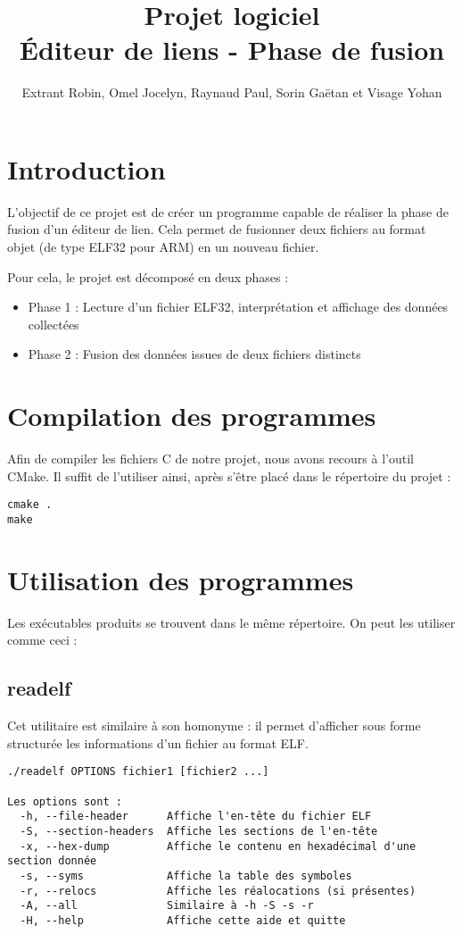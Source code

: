 \documentclass[a4paper,11pt]{article}
\title{Projet logiciel \\ Éditeur de liens - Phase de fusion}
\author{Extrant Robin, Omel Jocelyn, Raynaud Paul, Sorin Gaëtan et Visage Yohan}
\begin{document}
\maketitle
\tableofcontents

\section{Introduction}
L'objectif de ce projet est de créer un programme capable de réaliser la phase de fusion d'un éditeur de lien. Cela permet de fusionner deux fichiers au format objet (de type ELF32 pour ARM) en un nouveau fichier.

Pour cela, le projet est décomposé en deux phases :
\begin{itemize}
\item Phase 1 : Lecture d'un fichier ELF32, interprétation et affichage des données collectées
\item Phase 2 : Fusion des données issues de deux fichiers distincts
\end{itemize}

\section{Compilation des programmes}
Afin de compiler les fichiers C de notre projet, nous avons recours à l'outil CMake. Il suffit de l'utiliser ainsi, après s'être placé dans le répertoire du projet :
\begin{verbatim}
cmake .
make
\end{verbatim}

\section{Utilisation des programmes}
Les exécutables produits se trouvent dans le même répertoire. On peut les utiliser comme ceci :
\subsection{readelf}
Cet utilitaire est similaire à son homonyme : il permet d'afficher sous forme structurée les informations d'un fichier au format ELF.
\begin{verbatim}
./readelf OPTIONS fichier1 [fichier2 ...]

Les options sont :
  -h, --file-header      Affiche l'en-tête du fichier ELF
  -S, --section-headers  Affiche les sections de l'en-tête
  -x, --hex-dump         Affiche le contenu en hexadécimal d'une section donnée
  -s, --syms             Affiche la table des symboles
  -r, --relocs           Affiche les réalocations (si présentes)
  -A, --all              Similaire à -h -S -s -r
  -H, --help             Affiche cette aide et quitte
\end{verbatim}
\end{document}
